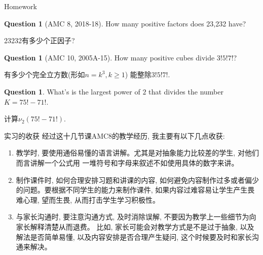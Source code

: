 \documentclass{beamer}
\theoremstyle{definition}
\newtheorem{ques}[defn]{Question}
\newenvironment{enu}{\begin{enumerate}[(1)]}{\end{enumerate}}
\begin{document}
\begin{frame}{Homework}
    \begin{ques}[AMC 8, 2018-18]
        How many positive factors does 23,232 have?

        23232有多少个正因子?
    \end{ques}
    \begin{ques}[AMC 10, 2005A-15]
        How many positive cubes divide $3!5!7!$? 

        有多少个完全立方数(形如$n=k^3,k\ge 1$) 能整除$3!5!7!$.
    \end{ques}
    \begin{ques}
        What's is the largest power of $2$ that divides the number $K=75!-71!$.

        计算$\nu_2(75!-71!)$.
    \end{ques}
\end{frame}
\begin{frame}{实习的收获}
    经过这十几节课AMC8的教学经历, 我主要有以下几点收获:
    \begin{enu}
      \item 教学时, 要使用通俗易懂的语言讲解。尤其是对抽象能力比较差的学生, 对他们而言讲解一个公式用
      一堆符号和字母来叙述不如使用具体的数字来讲。 
      \item 制作课件时, 如何合理安排习题和讲课的内容, 如何避免内容制作过多或者偏少的问题。要根据不同学生的能力来制作课件, 
      如果内容过难容易让学生产生畏难心理, 望而生畏, 从而打击学生学习积极性。
      \item 与家长沟通时, 要注意沟通方式, 及时消除误解, 不要因为教学上一些细节为向家长解释清楚从而退费。
      比如, 家长可能会对教学方式是不是过于抽象, 以及解法是否简单易懂, 以及内容安排是否合理产生疑问,
      这个时候要及时和家长沟通来解决。
\end{enu}

\end{frame}
\end{document}
